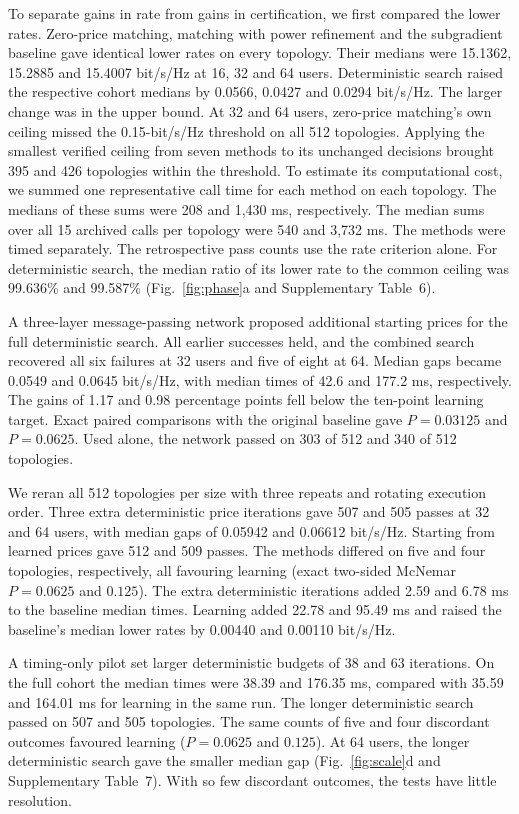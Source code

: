 \documentclass[lineno,pdflatex,sn-nature]{sn-jnl}
\begin{document}
To separate gains in rate from gains in certification, we first compared the lower rates. Zero-price matching, matching with power refinement and the subgradient baseline gave identical lower rates on every topology. Their medians were 15.1362, 15.2885 and 15.4007 bit/s/Hz at 16, 32 and 64 users. Deterministic search raised the respective cohort medians by 0.0566, 0.0427 and 0.0294 bit/s/Hz. The larger change was in the upper bound. At 32 and 64 users, zero-price matching's own ceiling missed the 0.15-bit/s/Hz threshold on all 512 topologies. Applying the smallest verified ceiling from seven methods to its unchanged decisions brought 395 and 426 topologies within the threshold. To estimate its computational cost, we summed one representative call time for each method on each topology. The medians of these sums were 208 and 1,430 ms, respectively. The median sums over all 15 archived calls per topology were 540 and 3,732 ms. The methods were timed separately. The retrospective pass counts use the rate criterion alone. For deterministic search, the median ratio of its lower rate to the common ceiling was 99.636\% and 99.587\% (Fig.~\ref{fig:phase}a and Supplementary Table~6).


A three-layer message-passing network proposed additional starting prices for the full deterministic search. All earlier successes held, and the combined search recovered all six failures at 32 users and five of eight at 64. Median gaps became 0.0549 and 0.0645 bit/s/Hz, with median times of 42.6 and 177.2 ms, respectively. The gains of 1.17 and 0.98 percentage points fell below the ten-point learning target. Exact paired comparisons with the original baseline gave \(P=0.03125\) and \(P=0.0625\). Used alone, the network passed on 303 of 512 and 340 of 512 topologies.

We reran all 512 topologies per size with three repeats and rotating execution order. Three extra deterministic price iterations gave 507 and 505 passes at 32 and 64 users, with median gaps of 0.05942 and 0.06612 bit/s/Hz. Starting from learned prices gave 512 and 509 passes. The methods differed on five and four topologies, respectively, all favouring learning (exact two-sided McNemar \(P=0.0625\) and \(0.125\)). The extra deterministic iterations added 2.59 and 6.78 ms to the baseline median times. Learning added 22.78 and 95.49 ms and raised the baseline's median lower rates by 0.00440 and 0.00110 bit/s/Hz.


A timing-only pilot set larger deterministic budgets of 38 and 63 iterations. On the full cohort the median times were 38.39 and 176.35 ms, compared with 35.59 and 164.01 ms for learning in the same run. The longer deterministic search passed on 507 and 505 topologies. The same counts of five and four discordant outcomes favoured learning (\(P=0.0625\) and \(0.125\)). At 64 users, the longer deterministic search gave the smaller median gap (Fig.~\ref{fig:scale}d and Supplementary Table~7). With so few discordant outcomes, the tests have little resolution.
\end{document}
